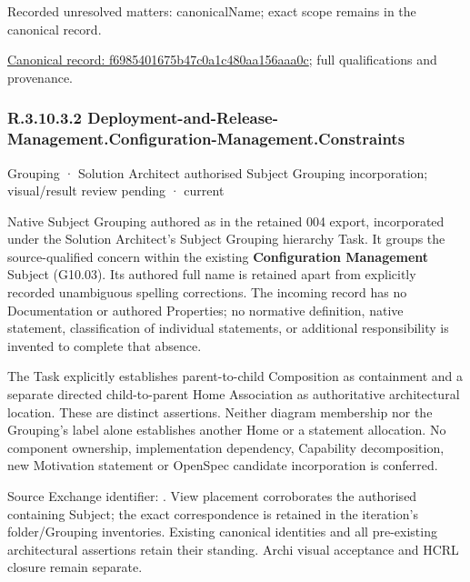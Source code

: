 {\small Recorded unresolved matters: canonicalName; exact scope remains in the canonical record.}\par
{\footnotesize \href{../../../../continuum/grouping/f6985401675b47c0a1c480aa156aaa0c.md}{Canonical record: f6985401675b47c0a1c480aa156aaa0c}; full qualifications and provenance.}\par
\subsubsection*{R.3.10.3.2 Deployment-and-Release-Management.Configuration-Management.Constraints}
\label{navigation:R.3.10.3.2}

\label{element:5f25a2e8082d486d8f2b87aec6667e33}
{\small Grouping · Solution Architect authorised Subject Grouping incorporation; visual/result review pending · current}\par

Native Subject Grouping authored as \texttt{} in the retained 004 export,
incorporated under the Solution Architect's Subject Grouping hierarchy Task.
It groups the source-qualified \texttt{} concern within
the existing \textbf{Configuration Management} Subject (G10.03). Its authored full name
is retained apart from explicitly recorded unambiguous spelling corrections.
The incoming record has no Documentation or authored Properties; no normative
definition, native statement, classification of individual statements, or
additional responsibility is invented to complete that absence.



The Task explicitly establishes parent-to-child Composition as containment and
a separate directed child-to-parent Home Association as authoritative architectural
location. These are distinct assertions. Neither diagram membership nor the
Grouping's label alone establishes another Home or a statement allocation.
No component ownership, implementation dependency, Capability decomposition,
new Motivation statement or OpenSpec candidate incorporation is conferred.



Source Exchange identifier: \texttt{}. View placement corroborates
the authorised containing Subject; the exact correspondence is retained in the
iteration's folder/Grouping inventories. Existing canonical identities and all
pre-existing architectural assertions retain their standing. Archi visual
acceptance and HCRL closure remain separate.


